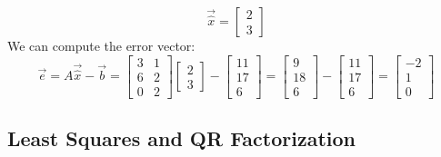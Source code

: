 \begin{eg}
    \[
        \vec{\hat{x}} = \begin{bmatrix}
            2 \\ 3
        \end{bmatrix}
    \]
    We can compute the error vector:
    \[
        \vec{e} = A \vec{\hat{x}} - \vec{b} = \begin{bmatrix}
            3 & 1 \\ 6 & 2 \\ 0 & 2
        \end{bmatrix} \begin{bmatrix}
            2 \\ 3
        \end{bmatrix} - \begin{bmatrix}
            11 \\ 17 \\ 6
        \end{bmatrix} = \begin{bmatrix}
            9 \\ 18 \\ 6
        \end{bmatrix} - \begin{bmatrix}
            11 \\ 17 \\ 6
        \end{bmatrix} = \begin{bmatrix}
            -2 \\ 1 \\ 0
        \end{bmatrix}
    \]
\end{eg}

\subsection{Least Squares and QR Factorization}

